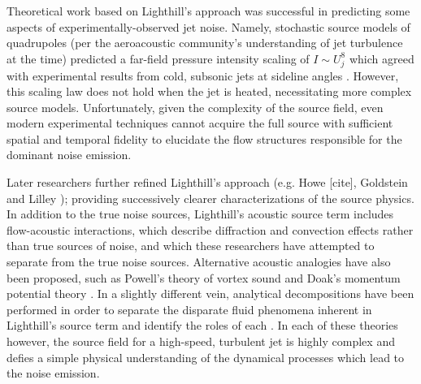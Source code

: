 Theoretical work based on Lighthill's approach was successful in predicting some aspects of experimentally-observed jet noise.
Namely, stochastic source models of quadrupoles (per the aeroacoustic community's understanding of jet turbulence at the time) predicted a far-field pressure intensity scaling of $I \sim U_{j}^{8}$ which agreed with experimental results from cold, subsonic jets at sideline angles \citep{Viswanathan2006}.
However, this scaling law does not hold when the jet is heated, necessitating more complex source models. 
Unfortunately, given the complexity of the source field, even modern experimental techniques cannot acquire the full source with sufficient spatial and temporal fidelity to elucidate the flow structures responsible for the dominant noise emission.

Later researchers further refined Lighthill's approach (e.g. Howe [cite], Goldstein \citep{Goldstein1974} and Lilley \citep{Lilley2003}); providing successively clearer characterizations of the source physics.
In addition to the true noise sources, Lighthill's acoustic source term includes flow-acoustic interactions, which describe diffraction and convection effects rather than true sources of noise, and which these researchers have attempted to separate from the true noise sources.
Alternative acoustic analogies have also been proposed, such as Powell's theory of vortex sound \citep{Powell1964} and Doak's momentum potential theory \citep{Doak1989}.
In a slightly different vein, analytical decompositions have been performed in order to separate the disparate fluid phenomena inherent in Lighthill's source term and identify the roles of each \citep{Cabana2008}.
In each of these theories however, the source field for a high-speed, turbulent jet is highly complex and defies a simple physical understanding of the dynamical processes which lead to the noise emission.   

